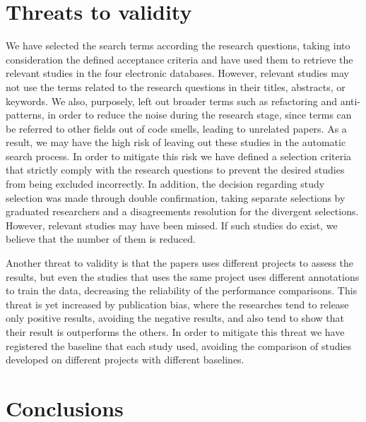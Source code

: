 



\section{Threats to validity}

We have selected the search terms according the research questions, taking into consideration the defined acceptance criteria and have used them to retrieve the relevant studies in the four electronic databases. However, relevant studies may not use the terms related to the research questions in their titles, abstracts, or keywords. We also, purposely, left out broader terms such as refactoring and anti-patterns, in order to reduce the noise during the research stage, since terms can be referred to other fields out of code smells, leading to unrelated papers.  As a result, we may have the high risk of leaving out these studies in the automatic search process. In order to mitigate this risk we have defined a selection criteria that strictly comply with the research questions to prevent the desired studies from being excluded incorrectly. In addition, the decision regarding study selection was made through double confirmation, taking separate selections by graduated researchers and a disagreements resolution for the divergent selections. However, relevant studies may have been missed. If such studies do exist, we believe that the number of them is reduced.

Another threat to validity is that the papers uses different projects to assess the results, but even the studies that uses the same project uses different annotations to train the data, decreasing the reliability of the performance comparisons. This threat is yet increased by publication bias, where the researches tend to release only positive results, avoiding the negative results, and also tend to show that their result is outperforms the others. In order to mitigate this threat we have registered the baseline that each study used, avoiding the comparison of studies developed on different projects with different baselines.

\section{Conclusions}

